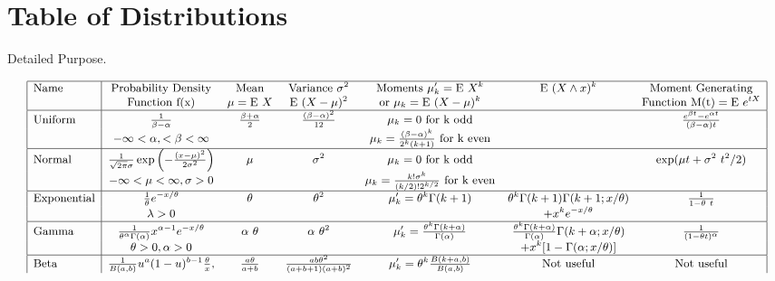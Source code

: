 \documentclass[]{book}
\theoremstyle{definition}
\theoremstyle{definition}
\theoremstyle{definition}
\theoremstyle{remark}
\begin{document}
\chapter{Table of Distributions}\label{table-of-distributions}

Detailed Purpose.

\[
{\small
\begin{matrix}
\begin{array}{|l|cccccc|}
\hline
      \text{Name} & \text{Probability Density}  &       \text{Mean} & \text{Variance } \sigma^2 & \text{Moments } \mu_k'=\mathrm{E~}X^k & \mathrm{E~}(X\wedge x)^k & \text{Moment Generating} \\
           & \text{Function f(x)}  & \mu=\mathrm{E~}X & \mathrm{E~}(X-\mu)^2 & \text{or } \mu_k=\mathrm{E~}(X-\mu)^k &            & \text{Function M(t)}=\mathrm{E~}e^{tX} \\
\hline
   \text{Uniform} & \frac{1}{\beta-\alpha} & \frac{\beta+\alpha}{2} & \frac{(\beta-\alpha)^2}{12} & \mu_k=0 \text{ for k odd} &            & \frac{e^{\beta t}-e^{\alpha t}}{(\beta-\alpha)t} \\
           & -\infty<\alpha, <\beta<\infty &  & & \mu_k=\frac{(\beta-\alpha)^k}{2^k(k+1)} \text{ for k even} &            & \\
\hline
    \text{Normal} & \frac{1}{\sqrt{2\pi}\sigma}\exp\left( -\frac{(x-\mu)^2}{2\sigma^2}\right)  &     \mu & \sigma^2 & \mu_k=0 \text{ for k odd} &            & \exp(\mu t+\sigma^2~t^2/2) \\
           & -\infty<\mu<\infty, \sigma>0  &            &            & \mu_k=\frac{k!\sigma^k}{(k/2)!2^{k/2}} \text{ for k even} &            &            \\
\hline
\text{Exponential} & \frac{1}{\theta}e^{-x/\theta} &  \theta & \theta^2 & \mu_k'=\theta^k \Gamma (k+1) & \theta^k\Gamma (k+1)\Gamma (k+1;x/\theta) & \frac{1}{1-\theta~t} \\
           & \lambda>0 &            &            &            & +x^k e^{-x/\theta} & \\
\hline
     \text{Gamma} & \frac{1}{\theta^{\alpha}\Gamma(\alpha)}x^{\alpha-1}e^{-x/\theta} & \alpha~\theta & \alpha~\theta^2 & \mu_k'=\frac{\theta^k\Gamma(k+\alpha)}{\Gamma(\alpha)} & \frac{\theta^k\Gamma(k+\alpha)}{\Gamma(\alpha)}\Gamma(k+\alpha; x/\theta) & \frac{1}{(1-\theta t)^{\alpha}} \\
           & \theta>0, \alpha>0 &            &            & & +x^k[1-\Gamma(\alpha; x/\theta)] & \\
\hline
      \text{Beta} & \frac{1}{B(a,b)} u^a(1-u)^{b-1}\frac{\theta}{x}, & \frac{a \theta}{a+b} & \frac{ab\theta^2}{(a+b+1)(a+b)^2} & \mu_k'=\theta^k \frac{B(k+a,b)}{B(a,b)} & \text{Not useful} & \text{Not useful} \\

\end{array}
\end{matrix}}\]
\end{document}
